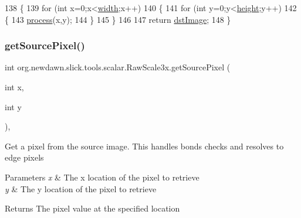 \begin{DoxyCode}
138     \{
139         \textcolor{keywordflow}{for} (\textcolor{keywordtype}{int} x=0;x<\mbox{\hyperlink{classorg_1_1newdawn_1_1slick_1_1tools_1_1scalar_1_1_raw_scale3x_a755ece4afefc43bbcd0e0b7757e20ce2}{width}};x++)
140         \{
141             \textcolor{keywordflow}{for} (\textcolor{keywordtype}{int} y=0;y<\mbox{\hyperlink{classorg_1_1newdawn_1_1slick_1_1tools_1_1scalar_1_1_raw_scale3x_a67f5f9e7b2f4e0be9915463c29eb1b7d}{height}};y++)
142             \{
143                 \mbox{\hyperlink{classorg_1_1newdawn_1_1slick_1_1tools_1_1scalar_1_1_raw_scale3x_ad2246ebbbbf59dcc24453071bb99edfa}{process}}(x,y);
144             \}
145         \}
146         
147         \textcolor{keywordflow}{return} \mbox{\hyperlink{classorg_1_1newdawn_1_1slick_1_1tools_1_1scalar_1_1_raw_scale3x_a998733a4f10166751b3dffd5be4f33f1}{dstImage}};
148     \}
\end{DoxyCode}
\mbox{\label{classorg_1_1newdawn_1_1slick_1_1tools_1_1scalar_1_1_raw_scale3x_ad4e113b12cee39ede023b4ce76a7e9f7}} 
\subsubsection{\texorpdfstring{get\+Source\+Pixel()}{getSourcePixel()}}
{\footnotesize\ttfamily int org.\+newdawn.\+slick.\+tools.\+scalar.\+Raw\+Scale3x.\+get\+Source\+Pixel (\begin{DoxyParamCaption}\item[{int}]{x,  }\item[{int}]{y }\end{DoxyParamCaption})\hspace{0.3cm}{\ttfamily [inline]}, {\ttfamily [private]}}

Get a pixel from the source image. This handles bonds checks and resolves to edge pixels


\begin{DoxyParams}{Parameters}
{\em x} & The x location of the pixel to retrieve \\
\hline
{\em y} & The y location of the pixel to retrieve \\
\hline
\end{DoxyParams}
\begin{DoxyReturn}{Returns}
The pixel value at the specified location 
\end{DoxyReturn}

